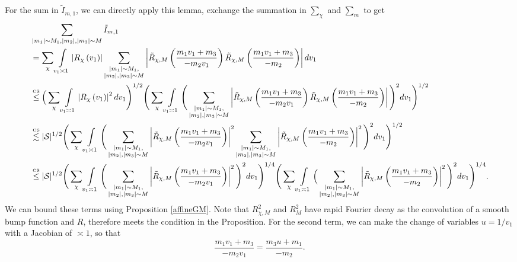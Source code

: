 For the sum in $\tilde{I}_{m,1}$, we can directly apply this lemma, exchange the summation in $\sum_\chi$ and $\sum_m$ to get \begin{align*}
    &\sum_{\substack {|m_1|\sim M_1,|m_2|,|m_3|\sim M}}\tilde{I}_{m,1}\\
   &  =\sum_{\chi}\int\displaylimits_{v_1\asymp 1}  \left|R_\chi\left(v_1\right)\right|\sum_{\substack {|m_1|\sim M_1,\\|m_2|,|m_3|\sim M}}\left| \tilde{R}_{\chi,M}\left(\frac{m_1v_1+m_3}{-m_2v_1}\right)
    \tilde{R}_{\chi,M}\left(\frac{m_1v_1+m_3}{-m_2}\right)\right|dv_1\\
    &\stackon{CS}{\leq} \Big( \sum_{\chi}\int\displaylimits_{v_1\asymp 1}  \left|R_\chi\left(v_1\right)\right|^2 dv_1 \Bigg)^{1/2} \Bigg(\sum_{\chi}\int\displaylimits_{v_1\asymp 1}\Bigg(\sum_{\substack {|m_1|\sim M_1,\\|m_2|,|m_3|\sim M}}\left| \tilde{R}_{\chi,M}\left(\frac{m_1v_1+m_3}{-m_2v_1}\right)
    \tilde{R}_{\chi,M}\left(\frac{m_1v_1+m_3}{-m_2}\right)\right|\Bigg)^2dv_1\Bigg)^{1/2}\\
    &\stackon{CS}{\lesssim} |\mathcal{S}|^{1/2} \Bigg(\sum_{\chi}\int\displaylimits_{v_1\asymp 1}\Bigg(\sum_{\substack {|m_1|\sim M_1,\\|m_2|,|m_3|\sim M}}\left| \tilde{R}_{\chi,M}\left(\frac{m_1v_1+m_3}{-m_2v_1}\right)\right|^2 \sum_{\substack {|m_1|\sim M_1,\\|m_2|,|m_3|\sim M}}\left|
    \tilde{R}_{\chi,M}\left(\frac{m_1v_1+m_3}{-m_2}\right)\right|^2\Bigg)^2dv_1\Bigg)^{1/2}\\
    &\stackon{CS}{\leq}|\mathcal{S}|^{1/2} \Bigg(\sum_{\chi}
    \int\displaylimits_{v_1\asymp 1}\Bigg(\sum_{\substack {|m_1|\sim M_1,\\|m_2|,|m_3|\sim M}}\left| \tilde{R}_{\chi,M}\left(\frac{m_1v_1+m_3}{-m_2v_1}\right)\right|^2\Bigg)^2 dv_1 \Bigg)^{1/4}\Bigg(\sum_{\chi}
    \int\displaylimits_{v_1\asymp 1}\Big(
    \sum_{\substack {|m_1|\sim M_1,\\|m_2|,|m_3|\sim M}}\left|
    \tilde{R}_{\chi,M}\left(\frac{m_1v_1+m_3}{-m_2}\right)\right|^2\Bigg)^2dv_1\Bigg)^{1/4}.
\end{align*} 
We can bound these terms using Proposition \ref{affineGM}. Note that $R_{\chi,M}^2$ and $R_M^2$ have rapid Fourier decay as the convolution of a smooth bump function and $R$, therefore meets the condition in the Proposition.
For the second term, we can make the change of variables $u=1/v_1$ with a Jacobian of $\asymp 1$, so that \[
\frac{m_1v_1+m_3}{-m_2v_1}= \frac{m_3u + m_1}{-m_2}.
\]
